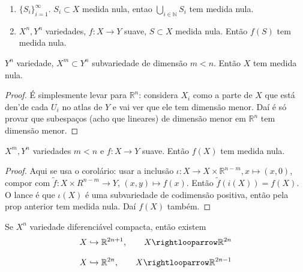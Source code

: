 \begin{coro}\leavevmode
	\begin{enumerate}
	\item \(\{S_i\}_{i=1}^\infty\).  \(S_i \subset X\) medida nula, entao \(\bigcup_{i \in \mathbb{N}}S_i\) tem medida nula.
	\item \(X^n, Y^n\) variedades, \(f:X \to Y\) suave, \(S \subset X\) medida nula. Então \(f(S)\) tem medida nula.
	\end{enumerate}
\end{coro}

\begin{prop}\leavevmode
\(Y^n\) variedade, \(X^m \subset Y^n\) subvariedade de dimensão \(m <n\). Então \(X\) tem medida nula.
\end{prop}

\begin{proof}\leavevmode
É simplesmente levar para \(\mathbb{R}^n\): considera \(X_i\) como a parte de \(X\) que está den'de cada  \(U_i\) no atlas de \(Y\) e vai ver que ele tem dimensão menor. Daí é só provar que subespaços (acho que lineares) de dimensão menor em \(\mathbb{R}^n\) tem dimensão menor.
\end{proof}

\begin{coro}[Minisard]\leavevmode
\(X^m,Y^n\) variedades \(m<n\)  e \(f:X \to Y\) suave. Então \(f(X)\) tem medida nula.
\end{coro}

\begin{proof}\leavevmode
Aqui se usa o corolário: usar a inclusão \(\iota:X \to X \times \mathbb{R}^{n-m},x \mapsto (x,0)\), compor com \(\tilde{f}:X \times R^{n-m}\to Y\), \((x,y) \mapsto  f(x)\). Então \(\tilde{f}(i(X))=f(X)\). O lance é que \(\iota(X)\) é uma subvariedade de codimensão positiva, então pela prop anterior tem medida nula. Daí $f(X)$ também.
\end{proof}

\begin{coro}\leavevmode
	Se \(X^n\) variedade diferenciável compacta, então existem 
	\[X \hookrightarrow \mathbb{R}^{2n+1},\qquad  X\rightlooparrow \mathbb{R}^{2n}\]
\end{coro}

\begin{thm}\leavevmode
\[X \hookrightarrow \mathbb{R}^{2n},\qquad  X\rightlooparrow \mathbb{R}^{2n-1}\]
\end{thm}

